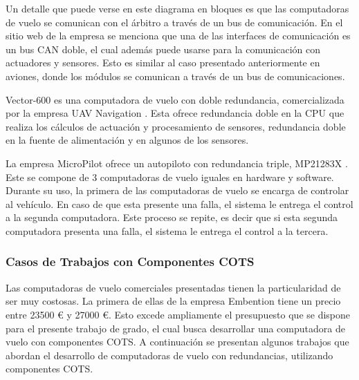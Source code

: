 

Un detalle que puede verse en este diagrama en bloques es que las computadoras de vuelo se comunican con el árbitro a través de un bus de comunicación. En el sitio web de la empresa se menciona que una de las interfaces de comunicación es un bus CAN doble, el cual además puede usarse para la comunicación con actuadores y sensores. Esto es similar al caso presentado anteriormente en aviones, donde los módulos se comunican a través de un bus de comunicaciones.

Vector-600 es una computadora de vuelo con doble redundancia, comercializada por la empresa UAV Navigation \cite{uav-navigation-vector-600}. Esta ofrece redundancia doble en la CPU que realiza los cálculos de actuación y procesamiento de sensores, redundancia doble en la fuente de alimentación y en algunos de los sensores.

La empresa MicroPilot ofrece un autopiloto con redundancia triple, MP21283X \cite{wwwmicropilotcom-no-date}. Este se compone de 3 computadoras de vuelo iguales en hardware y software. Durante su uso, la primera de las computadoras de vuelo se encarga de controlar al vehículo. En caso de que esta presente una falla, el sistema le entrega el control a la segunda computadora. Este proceso se repite, es decir que si esta segunda computadora presenta una falla, el sistema le entrega el control a la tercera.

\subsubsection{Casos de Trabajos con Componentes COTS}

Las computadoras de vuelo comerciales presentadas tienen la particularidad de ser muy costosas. La primera de ellas de la empresa Embention tiene un precio entre 23500 \euro{} y 27000 \euro{}. Esto excede ampliamente el presupuesto que se dispone para el presente trabajo de grado, el cual busca desarrollar una computadora de vuelo con componentes COTS. A continuación se presentan algunos trabajos que abordan el desarrollo de computadoras de vuelo con redundancias, utilizando componentes COTS.

